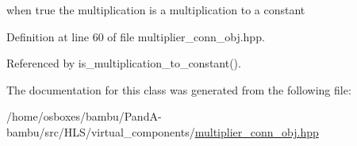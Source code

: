 when true the multiplication is a multiplication to a constant 



Definition at line 60 of file multiplier\+\_\+conn\+\_\+obj.\+hpp.



Referenced by is\+\_\+multiplication\+\_\+to\+\_\+constant().



The documentation for this class was generated from the following file\+:\begin{DoxyCompactItemize}
\item 
/home/osboxes/bambu/\+Pand\+A-\/bambu/src/\+H\+L\+S/virtual\+\_\+components/\hyperlink{multiplier__conn__obj_8hpp}{multiplier\+\_\+conn\+\_\+obj.\+hpp}\end{DoxyCompactItemize}
